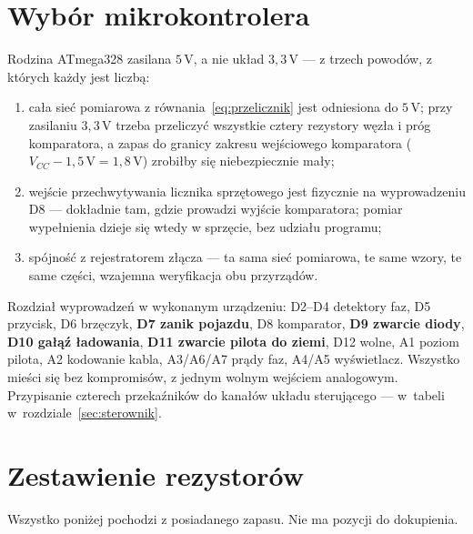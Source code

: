 \documentclass[a4paper,11pt]{article}
\newcommand{\volt}{\,\mathrm{V}}
\begin{document}
\section{Wybór mikrokontrolera}

Rodzina ATmega328 zasilana $5\volt$, a nie układ $3{,}3\volt$ --- z trzech powodów,
z których każdy jest liczbą:

\begin{enumerate}
\item cała sieć pomiarowa z równania~\eqref{eq:przelicznik} jest odniesiona do
      $5\volt$; przy zasilaniu $3{,}3\volt$ trzeba przeliczyć wszystkie cztery
      rezystory węzła i próg komparatora, a zapas do granicy zakresu wejściowego
      komparatora ($V_{CC}-1{,}5\volt = 1{,}8\volt$) zrobiłby się niebezpiecznie
      mały;
\item wejście przechwytywania licznika sprzętowego jest fizycznie na wyprowadzeniu
      D8 --- dokładnie tam, gdzie prowadzi wyjście komparatora; pomiar wypełnienia
      dzieje się wtedy w sprzęcie, bez udziału programu;
\item spójność z rejestratorem złącza --- ta sama sieć pomiarowa, te same wzory,
      te same części, wzajemna weryfikacja obu przyrządów.
\end{enumerate}

Rozdział wyprowadzeń w wykonanym urządzeniu: D2--D4 detektory faz, D5 przycisk,
D6 brzęczyk, \textbf{D7 zanik pojazdu}, D8 komparator, \textbf{D9 zwarcie diody},
\textbf{D10 gałąź ładowania}, \textbf{D11 zwarcie pilota do ziemi}, D12 wolne,
A1 poziom pilota, A2 kodowanie kabla, A3/A6/A7 prądy faz, A4/A5 wyświetlacz.
Wszystko mieści się bez kompromisów, z jednym wolnym wejściem analogowym.
Przypisanie czterech przekaźników do kanałów układu sterującego --- w~tabeli
w~rozdziale~\ref{sec:sterownik}.

\section{Zestawienie rezystorów}
\label{sec:zestawienie}

Wszystko poniżej pochodzi z posiadanego zapasu. Nie ma pozycji do dokupienia.
\end{document}

